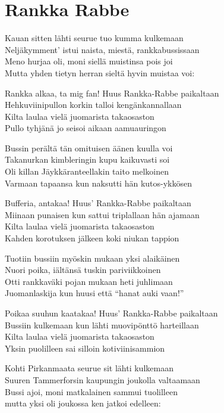 \section{Rankka Rabbe}
Kauan sitten lähti seurue tuo kumma kulkemaan\\
Neljäkymment’ istui naista, miestä, rankkabussissaan\\
Meno hurjaa oli, moni siellä muistinsa pois joi\\
Mutta yhden tietyn herran sieltä hyvin muistaa voi:

Rankka alkaa, ta mig fan! Huus Rankka-Rabbe paikaltaan\\
Hehkuviinipullon korkin talloi kengänkannallaan\\
Kilta laulaa vielä juomarista takaosaston\\
Pullo tyhjänä jo seisoi aikaan aamuauringon

Bussin perältä tän omituisen äänen kuulla voi\\
Takanurkan kimbleringin kupu kaikuvasti soi\\
Oli killan Jäykkäranteellakin taito melkoinen\\
Varmaan tapaansa kun naksutti hän kutos-ykkösen

Bufferia, antakaa! Huus’ Rankka-Rabbe paikaltaan\\
Miinaan punaisen kun sattui triplallaan hän ajamaan\\
Kilta laulaa vielä juomarista takaosaston\\
Kahden korotuksen jälkeen koki niukan tappion

Tuotiin bussiin myöskin mukaan yksi alaikäinen\\
Nuori poika, iältänsä tuskin pariviikkoinen\\
Otti rankkaväki pojan mukaan heti juhlimaan\\
Juomanlaskija kun huusi että “hanat auki vaan!”

Poikaa suuhun kaatakaa! Huus’ Rankka-Rabbe paikaltaan\\
Bussiin kulkemaan kun lähti muovipönttö harteillaan\\
Kilta laulaa vielä juomarista takaosaston\\
Yksin puolilleen sai silloin kotiviinisammion

Kohti Pirkanmaata seurue sit lähti kulkemaan\\
Suuren Tammerforsin kaupungin joukolla valtaamaan\\
Bussi ajoi, moni matkalainen sammui tuolilleen\\
mutta yksi oli joukossa ken jatkoi edelleen:

